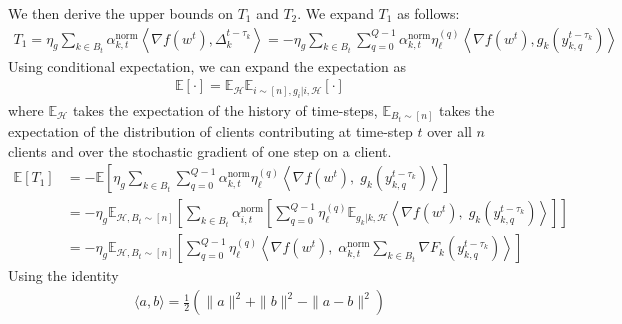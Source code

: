\documentclass{article}
\begin{document}
We then derive the upper bounds on $T_1$ and $T_2$. We expand $T_1$ as follows:
\begin{gather*}
    T_1 = \eta_g \sum_{k \in B_t}{\alpha^{\text{norm}}_{k, t} \left\langle 
            \nabla f(w^t), \Delta_k^{t-\tau_k}
        \right\rangle}
    = - \eta_g \sum_{k \in B_t}{
        \sum_{q=0}^{Q-1}{
            \alpha^{\text{norm}}_{k, t} \eta_\ell^{(q)}
            \left\langle 
                \nabla f(w^t), g_k\left(y_{k,q}^{t - \tau_k}\right)
            \right\rangle
        }
    }
\end{gather*}
Using conditional expectation, we can expand the expectation as
\begin{gather*}
    \mathbb{E}[\cdot] = \mathbb{E}_\mathcal{H}\mathbb{E}_{i \sim [n], g_i | i, \mathcal{H}}[\cdot]
\end{gather*}
where $\mathbb{E}_\mathcal{H}$ takes the expectation of the history of time-steps, $\mathbb{E}_{B_t\sim [n]}$ takes the expectation of the distribution of clients contributing at time-step $t$ over all $n$ clients and over the stochastic gradient of one step on a client.
\begin{align*}
    \mathbb{E}[T_1] 
    &= - \mathbb{E}\left[
        \eta_g \sum_{k \in B_t}{
        \sum_{q=0}^{Q-1}{
            \alpha^{\text{norm}}_{k, t} \eta_\ell^{(q)}
            \left\langle 
                \nabla f(w^t) ,\;
                g_k\left(y_{k,q}^{t - \tau_k}\right)
            \right\rangle
        }}
    \right] 
    \\
    &= - \eta_g \mathbb{E}_{\mathcal{H}, B_t \sim [n]}\left[
        \sum_{k\in B_t}{
        \alpha^{\text{norm}}_{i, t}
        \left[
            \sum_{q=0}^{Q-1}{
                 \eta_\ell^{(q)}
                 \mathbb{E}_{g_k | k, \mathcal{H}}
                \left\langle 
                    \nabla f(w^t) , \; 
                    g_k\left(y_{k,q}^{t - \tau_k}\right)
                \right\rangle
            }
        \right]
        }
    \right]
    \\
    &= - \eta_g \mathbb{E}_{\mathcal{H}, B_t \sim [n]}\left[ 
        \sum_{q=0}^{Q-1}{
                \eta_\ell^{(q)}
                \left\langle 
                    \nabla f(w^t), \; 
                    \alpha^{\text{norm}}_{k, t} \sum_{k \in B_t}{
                    \nabla F_k\left(y_{k, q}^{t- \tau_k}\right)}
                \right\rangle
        }
    \right]
\end{align*}
Using the identity
\begin{gather*}
    \langle a, b\rangle = \frac{1}{2}\left(
        \|a\|^2 + \|b\|^2 - \|a - b\|^2
    \right)
\end{gather*}
\end{document}

